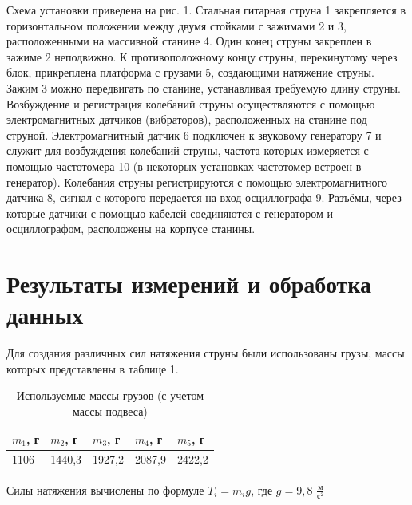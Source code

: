 \documentclass[a4paper,12pt]{article}
\begin{document}
	Схема установки приведена на рис. 1. Стальная гитарная струна 1 закрепляется в горизонтальном положении между двумя стойками с зажимами 2 и 3, расположенными на массивной станине 4. Один конец струны 
закреплен в зажиме 2 неподвижно. К противоположному концу струны, перекинутому через блок, прикреплена платформа с грузами 5, создающими 
натяжение струны. Зажим 3 можно передвигать по станине, устанавливая 
требуемую длину струны. Возбуждение и регистрация колебаний струны 
осуществляются с помощью электромагнитных датчиков (вибраторов), 
расположенных на станине под струной. Электромагнитный датчик 6 подключен к звуковому генератору 7 и служит для возбуждения колебаний струны, частота которых измеряется с помощью частотомера 10 (в некоторых установках частотомер встроен в генератор). Колебания струны регистрируются с помощью электромагнитного датчика 8, сигнал с которого 
передается на вход осциллографа 9. Разъёмы, через которые датчики с помощью кабелей соединяются с генератором и осциллографом, расположены на корпусе станины.
\pagebreak

\section{Результаты измерений и обработка данных}

Для создания различных сил натяжения струны были использованы грузы, массы которых представлены в таблице 1.

\begin{table}[!ht]
    \caption{Используемые массы грузов (с учетом массы подвеса)}
    \centering
    \begin{tabular}{|l|l|l|l|l|}
    \hline
        $m_1$, г & $m_2$, г & $m_3$, г & $m_4$, г & $m_5$, г \\ \hline
        1106 & 1440,3 & 1927,2 & 2087,9 & 2422,2 \\ \hline
    \end{tabular}
\end{table}

Силы натяжения вычислены по формуле $T_i = m_ig$, где $g=9,8$  $\frac{\text{м}}{\text{с}^2}$
\end{document}
